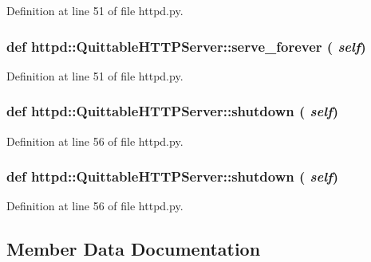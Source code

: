 Definition at line 51 of file httpd.py.

\hypertarget{classhttpd_1_1_quittable_h_t_t_p_server_ad7da0003b17805e7e629fa09a3a8f187}{
\subsubsection[{serve\_\-forever}]{\setlength{\rightskip}{0pt plus 5cm}def httpd::QuittableHTTPServer::serve\_\-forever ( {\em self})}}
\label{classhttpd_1_1_quittable_h_t_t_p_server_ad7da0003b17805e7e629fa09a3a8f187}


Definition at line 51 of file httpd.py.

\hypertarget{classhttpd_1_1_quittable_h_t_t_p_server_a7d527531f10ecbcb1db670cf816bbcbd}{
\subsubsection[{shutdown}]{\setlength{\rightskip}{0pt plus 5cm}def httpd::QuittableHTTPServer::shutdown ( {\em self})}}
\label{classhttpd_1_1_quittable_h_t_t_p_server_a7d527531f10ecbcb1db670cf816bbcbd}


Definition at line 56 of file httpd.py.

\hypertarget{classhttpd_1_1_quittable_h_t_t_p_server_a7d527531f10ecbcb1db670cf816bbcbd}{
\subsubsection[{shutdown}]{\setlength{\rightskip}{0pt plus 5cm}def httpd::QuittableHTTPServer::shutdown ( {\em self})}}
\label{classhttpd_1_1_quittable_h_t_t_p_server_a7d527531f10ecbcb1db670cf816bbcbd}


Definition at line 56 of file httpd.py.



\subsection{Member Data Documentation}
\hypertarget{classhttpd_1_1_quittable_h_t_t_p_server_a72e565dcba798dfd43d18268e92075a8}{
\subsubsection[{is\_\-running}]{}}
\label{classhttpd_1_1_quittable_h_t_t_p_server_a72e565dcba798dfd43d18268e92075a8}


